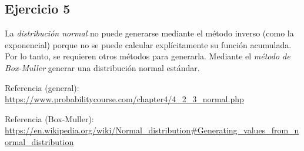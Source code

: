 \documentclass[a4paper]{article}
\begin{document}
\subsection{Ejercicio 5}

La \emph{distribución normal} no puede generarse mediante el método 
inverso (como la exponencial) porque no se puede calcular 
explícitamente su función acumulada. Por lo tanto, se requieren otros 
métodos para generarla. Mediante el \emph{método de Box-Muller} 
generar una distribución normal estándar.

\bigskip

Referencia (general): 
\url{https://www.probabilitycourse.com/chapter4/4_2_3_normal.php}

\smallskip

Referencia (Box-Muller): 
\url{https://en.wikipedia.org/wiki/Normal_distribution#Generating_values_from_normal_distribution}
\end{document}
